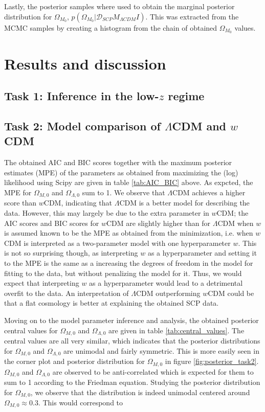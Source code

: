 \documentclass[11pt,a4paper]{article}
\begin{document}
Lastly, the posterior samples where used to obtain the marginal posterior distribution for $\Omega_{M_0}$, $p\left(\Omega_{M_0}\vert \mathcal{D}_{SCP} M_{\Lambda CDM} I\right)$. This was extracted from the MCMC samples by creating a histogram from the chain of obtained $\Omega_{M_0}$ values.

\section{Results and discussion}

\subsection[Task 1]{Task 1: Inference in the low-$z$ regime}

\subsection[Task 2]{Task 2: Model comparison of $\Lambda$CDM and $w$CDM}

The obtained AIC and BIC scores together with the maximum posterior estimates (MPE) of the parameters as obtained from maximizing the (log) likelihood using Scipy are given in table \ref{tab:AIC_BIC} above. As expcted, the MPE for $\Omega_{M,0}$ and $\Omega_{\Lambda,0}$ sum to 1. We observe that $\Lambda$CDM achieves a higher score than $w$CDM, indicating that $\Lambda$CDM is a better model for describing the data. However, this may largely be due to the extra parameter in $w$CDM; the AIC scores and BIC scores for $w$CDM are slightly higher than for $\Lambda$CDM when $w$ is assumed known to be the MPE as obtained from the minimization, i.e. when $w$CDM is interpreted as a two-parameter model with one hyperparameter $w$. This is not so surprising though, as interpreting $w$ as a hyperparameter and setting it to the MPE is the same as a increasing the degrees of freedom in the model for fitting to the data, but without penalizing the model for it. Thus, we would expect that interpreting $w$ as a hyperparameter would lead to a detrimental overfit to the data. An interpretation of $\Lambda$CDM outperforming $w$CDM could be that a flat cosmology is better at explaining the obtained SCP data.

Moving on to the model parameter inference and analysis, the obtained posterior central values for $\Omega_{M,0}$ and $\Omega_{\Lambda,0}$ are given in table \ref{tab:central_values}. The central values are all very similar, which indicates that the posterior distributions for $\Omega_{M,0}$ and $\Omega_{\Lambda,0}$ are unimodal and fairly symmetric. This is more easily seen in the corner plot and posterior distribution for $\Omega_{M,0}$ in figure \ref{fig:posterior_task2}. $\Omega_{M,0}$ and $\Omega_{\Lambda,0}$ are observed to be anti-correlated which is expected for them to sum to 1 according to the Friedman equation. Studying the posterior distribution for $\Omega_{M,0}$, we observe that the distribution is indeed unimodal centered around $\Omega_{M,0}\approx0.3$. This would correspond to  


\printbibliography
\end{document}
